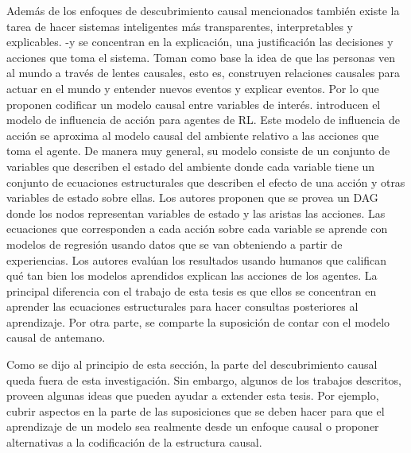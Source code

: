 Además de los enfoques de descubrimiento causal mencionados también existe la tarea de hacer sistemas inteligentes más transparentes, interpretables y explicables. \citet{shi2020selfsupervised}-y
\citet{madumal2019explainable} se concentran en la explicación, una justificación las decisiones y acciones que toma el sistema. Toman como base la idea de que las personas ven al mundo a través de lentes causales, esto es, construyen relaciones causales para actuar en el mundo y entender nuevos eventos y explicar eventos. Por lo que \citet{madumal2019explainable} proponen codificar un modelo causal entre variables de interés. introducen el modelo de influencia de acción para agentes de RL. Este modelo de influencia de acción se aproxima al modelo causal del ambiente relativo a las acciones que toma el agente. De manera muy general, su modelo consiste de un conjunto de variables que describen el estado del ambiente donde cada variable tiene un conjunto de ecuaciones estructurales que describen el efecto de una acción y otras variables de estado sobre ellas. Los autores proponen que se provea un DAG donde los nodos representan variables de estado y las aristas las acciones. Las ecuaciones que corresponden a cada acción sobre cada variable se aprende con modelos de regresión usando datos que se van obteniendo a partir de experiencias. Los autores evalúan los resultados usando humanos que califican qué tan bien los modelos aprendidos explican las acciones de los agentes. La principal diferencia con el trabajo de esta tesis es que ellos se concentran en aprender las ecuaciones estructurales para hacer consultas posteriores al aprendizaje. Por otra parte, se comparte la suposición de contar con el modelo causal de antemano.

Como se dijo al principio de esta sección, la 
parte del descubrimiento causal queda fuera
de esta investigación. Sin embargo, algunos de los trabajos descritos, proveen algunas ideas que 
pueden ayudar a extender esta tesis. Por ejemplo,
cubrir aspectos en la parte de las suposiciones
que se deben hacer para que el aprendizaje de un modelo sea realmente desde un enfoque causal o proponer alternativas
a la codificación de la estructura causal.




